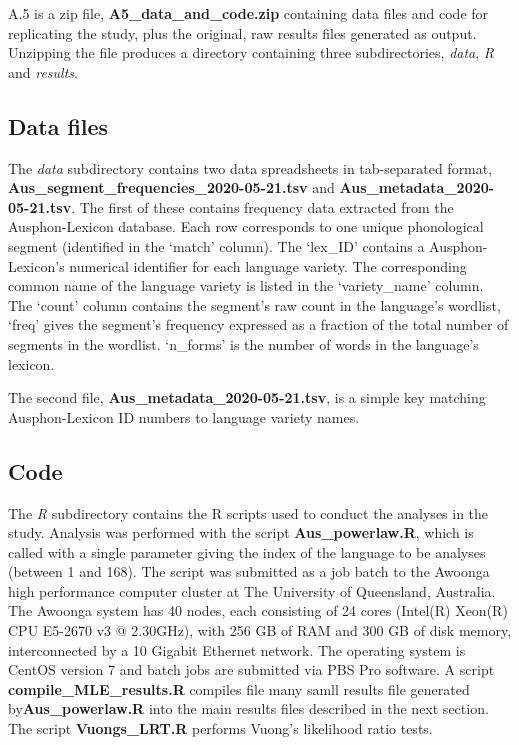 A.5 is a zip file, \textbf{A5\_data\_and\_code.zip} containing data
files and code for replicating the study, plus the original, raw results
files generated as output. Unzipping the file produces a directory
containing three subdirectories, \emph{data}, \emph{R} and
\emph{results}.

\hypertarget{data-files}{%
\subsection{Data files}\label{data-files}}

The \emph{data} subdirectory contains two data spreadsheets in
tab-separated format, \textbf{Aus\_segment\_frequencies\_2020-05-21.tsv}
and \textbf{Aus\_metadata\_2020-05-21.tsv}. The first of these contains
frequency data extracted from the Ausphon-Lexicon database. Each row
corresponds to one unique phonological segment (identified in the
`match' column). The `lex\_ID' contains a Ausphon-Lexicon's numerical
identifier for each language variety. The corresponding common name of
the language variety is listed in the `variety\_name' column. The
`count' column contains the segment's raw count in the language's
wordlist, `freq' gives the segment's frequency expressed as a fraction
of the total number of segments in the wordlist. `n\_forms' is the
number of words in the language's lexicon.

The second file, \textbf{Aus\_metadata\_2020-05-21.tsv}, is a simple key
matching Ausphon-Lexicon ID numbers to language variety names.

\hypertarget{code}{%
\subsection{Code}\label{code}}

The \emph{R} subdirectory contains the R scripts used to conduct the
analyses in the study. Analysis was performed with the script
\textbf{Aus\_powerlaw.R}, which is called with a single parameter giving
the index of the language to be analyses (between 1 and 168). The script
was submitted as a job batch to the Awoonga high performance computer
cluster at The University of Queensland, Australia. The Awoonga system
has 40 nodes, each consisting of 24 cores (Intel(R) Xeon(R) CPU E5-2670
v3 @ 2.30GHz), with 256 GB of RAM and 300 GB of disk memory,
interconnected by a 10 Gigabit Ethernet network. The operating system is
CentOS version 7 and batch jobs are submitted via PBS Pro software. A
script \textbf{compile\_MLE\_results.R} compiles file many samll results
file generated by\textbf{Aus\_powerlaw.R} into the main results files
described in the next section. The script \textbf{Vuongs\_LRT.R}
performs Vuong's likelihood ratio tests.

